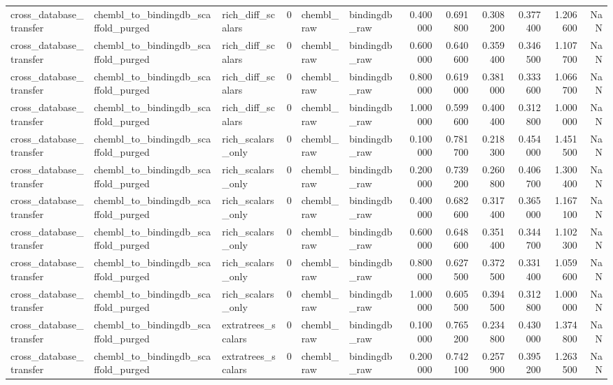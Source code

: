 \begin{longtable}{lllrllrrrrrr}
cross\_database\_transfer & chembl\_to\_bindingdb\_scaffold\_purged & rich\_diff\_scalars & 0 & chembl\_raw & bindingdb\_raw & 0.400000 & 0.691800 & 0.308200 & 0.377400 & 1.206600 & NaN \\
cross\_database\_transfer & chembl\_to\_bindingdb\_scaffold\_purged & rich\_diff\_scalars & 0 & chembl\_raw & bindingdb\_raw & 0.600000 & 0.640600 & 0.359400 & 0.346500 & 1.107700 & NaN \\
cross\_database\_transfer & chembl\_to\_bindingdb\_scaffold\_purged & rich\_diff\_scalars & 0 & chembl\_raw & bindingdb\_raw & 0.800000 & 0.619000 & 0.381000 & 0.333600 & 1.066700 & NaN \\
cross\_database\_transfer & chembl\_to\_bindingdb\_scaffold\_purged & rich\_diff\_scalars & 0 & chembl\_raw & bindingdb\_raw & 1.000000 & 0.599600 & 0.400400 & 0.312800 & 1.000000 & NaN \\
cross\_database\_transfer & chembl\_to\_bindingdb\_scaffold\_purged & rich\_scalars\_only & 0 & chembl\_raw & bindingdb\_raw & 0.100000 & 0.781700 & 0.218300 & 0.454000 & 1.451500 & NaN \\
cross\_database\_transfer & chembl\_to\_bindingdb\_scaffold\_purged & rich\_scalars\_only & 0 & chembl\_raw & bindingdb\_raw & 0.200000 & 0.739200 & 0.260800 & 0.406700 & 1.300400 & NaN \\
cross\_database\_transfer & chembl\_to\_bindingdb\_scaffold\_purged & rich\_scalars\_only & 0 & chembl\_raw & bindingdb\_raw & 0.400000 & 0.682600 & 0.317400 & 0.365000 & 1.167100 & NaN \\
cross\_database\_transfer & chembl\_to\_bindingdb\_scaffold\_purged & rich\_scalars\_only & 0 & chembl\_raw & bindingdb\_raw & 0.600000 & 0.648600 & 0.351400 & 0.344700 & 1.102300 & NaN \\
cross\_database\_transfer & chembl\_to\_bindingdb\_scaffold\_purged & rich\_scalars\_only & 0 & chembl\_raw & bindingdb\_raw & 0.800000 & 0.627500 & 0.372500 & 0.331400 & 1.059600 & NaN \\
cross\_database\_transfer & chembl\_to\_bindingdb\_scaffold\_purged & rich\_scalars\_only & 0 & chembl\_raw & bindingdb\_raw & 1.000000 & 0.605500 & 0.394500 & 0.312800 & 1.000000 & NaN \\
cross\_database\_transfer & chembl\_to\_bindingdb\_scaffold\_purged & extratrees\_scalars & 0 & chembl\_raw & bindingdb\_raw & 0.100000 & 0.765200 & 0.234800 & 0.430000 & 1.374800 & NaN \\
cross\_database\_transfer & chembl\_to\_bindingdb\_scaffold\_purged & extratrees\_scalars & 0 & chembl\_raw & bindingdb\_raw & 0.200000 & 0.742100 & 0.257900 & 0.395200 & 1.263500 & NaN \\

\end{longtable}
